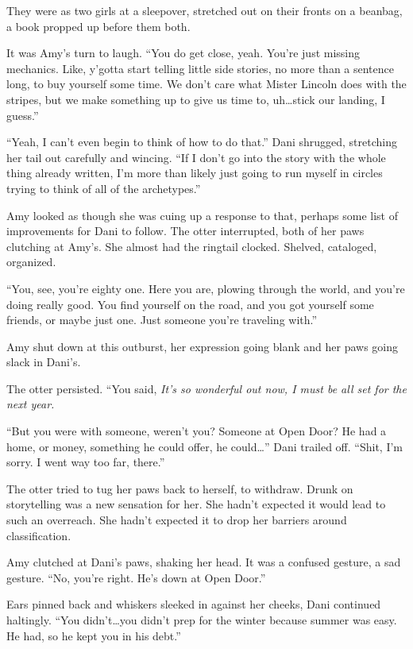 They were as two girls at a sleepover, stretched out on their fronts on a beanbag, a book propped up before them both.

It was Amy's turn to laugh. ``You do get close, yeah. You're just missing mechanics. Like, y'gotta start telling little side stories, no more than a sentence long, to buy yourself some time. We don't care what Mister Lincoln does with the stripes, but we make something up to give us time to, uh\ldots{}stick our landing, I guess.''

``Yeah, I can't even begin to think of how to do that.'' Dani shrugged, stretching her tail out carefully and wincing. ``If I don't go into the story with the whole thing already written, I'm more than likely just going to run myself in circles trying to think of all of the archetypes.''

Amy looked as though she was cuing up a response to that, perhaps some list of improvements for Dani to follow. The otter interrupted, both of her paws clutching at Amy's. She almost had the ringtail clocked. Shelved, cataloged, organized.

``You, see, you're eighty one. Here you are, plowing through the world, and you're doing really good. You find yourself on the road, and you got yourself some friends, or maybe just one. Just someone you're traveling with.''

Amy shut down at this outburst, her expression going blank and her paws going slack in Dani's.

The otter persisted. ``You said, \emph{It's so wonderful out now, I must be all set for the next year.}

``But you were with someone, weren't you? Someone at Open Door? He had a home, or money, something he could offer, he could\ldots{}'' Dani trailed off. ``Shit, I'm sorry. I went way too far, there.''

The otter tried to tug her paws back to herself, to withdraw. Drunk on storytelling was a new sensation for her. She hadn't expected it would lead to such an overreach. She hadn't expected it to drop her barriers around classification.

Amy clutched at Dani's paws, shaking her head. It was a confused gesture, a sad gesture. ``No, you're right. He's down at Open Door.''

Ears pinned back and whiskers sleeked in against her cheeks, Dani continued haltingly. ``You didn't\ldots{}you didn't prep for the winter because summer was easy. He had, so he kept you in his debt.''

